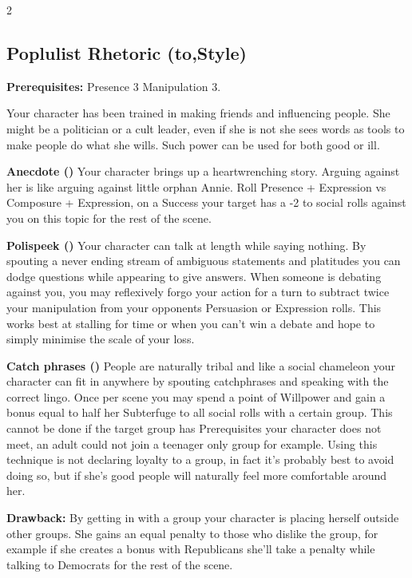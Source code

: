 \begin{multicols}{2}
\subsection*{Poplulist Rhetoric (\textbullet\nobreak\hspace{.16667em}to\nobreak\hspace{.16667em}\textbullet\textbullet\textbullet\textbullet\textbullet,\nobreak\hspace{.16667em}Style)}

\textbf{Prerequisites:} Presence 3 Manipulation 3.

Your character has been trained in making friends and influencing people. She might be a politician or a cult leader, even if she is not she sees words as tools to make people do what she wills. Such power can be used for both good or ill.

\textbf{Anecdote (\textbullet)} Your character brings up a heartwrenching story. Arguing against her is like arguing against little orphan Annie. Roll Presence + Expression vs Composure + Expression, on a Success your target has a -2 to social rolls against you on this topic for the rest of the scene.

\textbf{Polispeek (\textbullet\textbullet)} Your character can talk at length while saying nothing. By spouting a never ending stream of ambiguous statements and platitudes you can dodge questions while appearing to give answers. When someone is debating against you, you may reflexively forgo your action for a turn to subtract twice your manipulation from your opponents Persuasion or Expression rolls. This works best at stalling for time or when you can't win a debate and hope to simply minimise the scale of your loss.

\textbf{Catch phrases (\textbullet\textbullet\textbullet)} People are naturally tribal and like a social chameleon your character can fit in anywhere by spouting catchphrases and speaking with the correct lingo. Once per scene you may spend a point of Willpower and gain a bonus equal to half her Subterfuge to all social rolls with a certain group. This cannot be done if the target group has Prerequisites your character does not meet, an adult could not join a teenager only group for example. Using this technique is not declaring loyalty to a group, in fact it's probably best to avoid doing so, but if she's good people will naturally feel more comfortable around her.

\textbf{Drawback:} By getting in with a group your character is placing herself outside other groups. She gains an equal penalty to those who dislike the group, for example if she creates a bonus with Republicans she'll take a penalty while talking to Democrats for the rest of the scene. 


\end{multicols}
